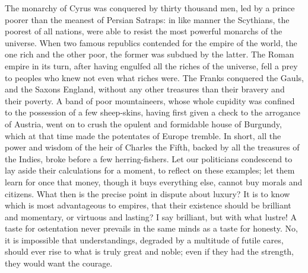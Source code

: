 The monarchy of Cyrus was conquered by thirty thousand men, led by a
prince poorer than the meanest of Persian Satraps: in like manner the
Scythians, the poorest of all nations, were able to resist the most
powerful monarchs of the universe. When two famous republics contended
for the empire of the world, the one rich and the other poor, the
former was subdued by the latter. The Roman empire in its turn, after
having engulfed all the riches of the universe, fell a prey to peoples
who knew not even what riches were. The Franks conquered the Gauls,
and the Saxons England, without any other treasures than their bravery
and their poverty. A band of poor mountaineers, whose whole cupidity
was confined to the possession of a few sheep-skins, having first
given a check to the arrogance of Austria, went on to crush the
opulent and formidable house of Burgundy, which at that time made the
potentates of Europe tremble. In short, all the power and wisdom of
the heir of Charles the Fifth, backed by all the treasures of the
Indies, broke before a few herring-fishers. Let our politicians
condescend to lay aside their calculations for a moment, to reflect on
these examples; let them learn for once that money, though it buys
everything else, cannot buy morals and citizens. What then is the
precise point in dispute about luxury?  It is to know which
is most advantageous to empires, that their existence should be
brilliant and momentary, or virtuous and lasting? I say brilliant, but
with what lustre! A taste for ostentation never prevails in the same
minds as a taste for honesty. No, it is impossible that
understandings, degraded by a multitude of futile cares, should ever
rise to what is truly great and noble; even if they had the strength,
they would want the courage.

